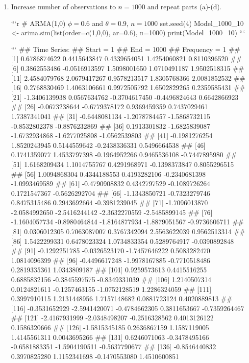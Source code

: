 \documentclass[
]{article}
\begin{document}
\begin{enumerate}[label=(\alph*)]
\item Increase number of observations to $n=1000$ and repeat parts (a)-(d).


```r
# ARMA(1,0) $\phi=0.6$ and $\theta= 0.9$, $n=1000$
set.seed(4)
Model_1000_10 <- arima.sim(list(order=c(1,0,0), ar=0.6), n=1000)
print(Model_1000_10)
```

```
## Time Series:
## Start = 1 
## End = 1000 
## Frequency = 1 
##    [1]  0.6786874622  0.4415643847  0.4339654051  1.4254060821  0.8110396520
##    [6]  0.3862553486 -0.0516913597  1.5098001650  1.0710491187  1.9502518315
##   [11]  2.4584079768  2.0679417267  0.9578213517  1.8305768366  2.0081852532
##   [16]  0.2768830469  1.4063106661  0.9972505792  1.6502829265  0.2359585431
##   [21] -1.3406139938  0.0567634762 -0.3704617450 -0.4496824643  0.6642866923
##   [26] -0.0673238644 -0.6779378172  0.9369459359  0.7437029461  1.7387341041
##   [31] -0.6448081134 -1.2078784457 -1.5868732115 -0.8532802378 -0.8876232869
##   [36]  0.1913301832 -1.6825839087 -1.6732934868 -1.6277025808 -1.0562539803
##   [41] -0.1981276254  1.8520243945  0.5144559642 -0.2438336331  0.5496664538
##   [46]  0.1741359077  1.4533797398 -0.1964952266  0.9465536108 -0.7447895980
##   [51]  1.6168209434  1.1014755767  0.4291968971 -0.1398373847  0.8055296515
##   [56]  1.0094868304  0.4344188553  0.4193282106 -0.2340681398 -1.0993469589
##   [61] -0.4790908832  0.4342797529 -0.1089726264  0.1721547367 -0.5626292704
##   [66] -1.1343850721 -0.7323279746  0.8475315486  0.2943692664 -0.3981239045
##   [71] -1.7096013870 -2.0584992650 -2.5416244142 -2.3632270559 -2.5485899145
##   [76] -1.1604057734 -0.8980464844 -1.8164877934 -1.8879051567 -0.9736606711
##   [81]  0.0306012305  0.7063087007  0.3767342094  2.5563622039  0.9562513314
##   [86]  1.5422299331  0.6478023324  1.0734833354  0.5289764917 -0.0390892848
##   [91] -0.1292251785 -0.0326523170 -1.7457646222  0.5083282470  1.0814096399
##   [96] -0.4496617248 -1.9978167885 -0.7710518486  0.2819335361  1.0343809187
##  [101]  0.9259573613  0.4415516255  0.6885832156 -0.3845597575 -0.8349331039
##  [106]  1.2140507314  0.0124821611 -0.1257463155 -1.0752128519  1.2286324059
##  [111]  0.3997910115  1.2131448956  1.7157148682  0.0881723124  0.4020889813
##  [116] -0.3531652929 -2.5941420071 -0.4784662305  0.3811653667 -0.7359264467
##  [121] -2.4167931999 -2.0348498207 -0.2516328562  0.4013126122  0.1586320666
##  [126] -1.5815345185  0.2636867159  1.1587119005  1.4145561311  0.0043695266
##  [131]  0.6246071063 -0.3478495166 -0.6581883351 -1.5904190511 -0.5637790677
##  [136] -0.8546440832  0.3970825280  1.1152341698 -0.1470553080  1.4510600851

\end{enumerate}
\end{document}
